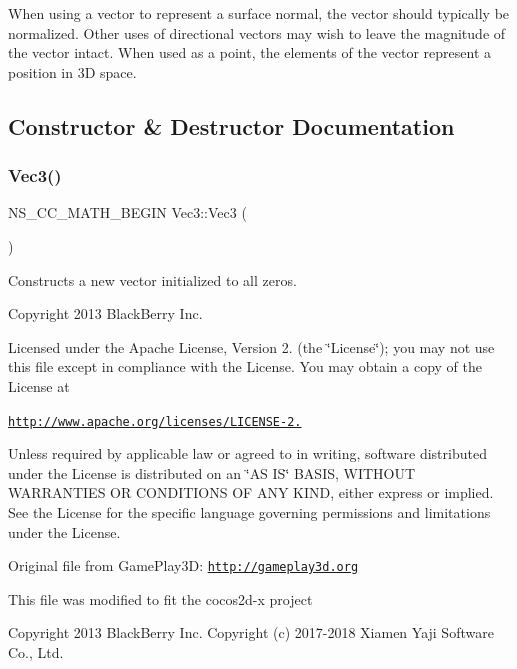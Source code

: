 When using a vector to represent a surface normal, the vector should typically be normalized. Other uses of directional vectors may wish to leave the magnitude of the vector intact. When used as a point, the elements of the vector represent a position in 3D space. 

\subsection{Constructor \& Destructor Documentation}
\mbox{\label{classVec3_a4450bf868c5115de1f2db066cb7067f4}} 
\subsubsection{\texorpdfstring{Vec3()}{Vec3()}\hspace{0.1cm}{\footnotesize\ttfamily [1/9]}}
{\footnotesize\ttfamily N\+S\+\_\+\+C\+C\+\_\+\+M\+A\+T\+H\+\_\+\+B\+E\+G\+IN Vec3\+::\+Vec3 (\begin{DoxyParamCaption}{ }\end{DoxyParamCaption})}

Constructs a new vector initialized to all zeros.

Copyright 2013 Black\+Berry Inc.

Licensed under the Apache License, Version 2. (the \char`\"{}\+License\char`\"{}); you may not use this file except in compliance with the License. You may obtain a copy of the License at

\href{http://www.apache.org/licenses/LICENSE-2.0}{\tt http\+://www.\+apache.\+org/licenses/\+L\+I\+C\+E\+N\+S\+E-\/2.}

Unless required by applicable law or agreed to in writing, software distributed under the License is distributed on an \char`\"{}\+A\+S I\+S\char`\"{} B\+A\+S\+IS, W\+I\+T\+H\+O\+UT W\+A\+R\+R\+A\+N\+T\+I\+ES OR C\+O\+N\+D\+I\+T\+I\+O\+NS OF A\+NY K\+I\+ND, either express or implied. See the License for the specific language governing permissions and limitations under the License.

Original file from Game\+Play3D\+: \href{http://gameplay3d.org}{\tt http\+://gameplay3d.\+org}

This file was modified to fit the cocos2d-\/x project

Copyright 2013 Black\+Berry Inc. Copyright (c) 2017-\/2018 Xiamen Yaji Software Co., Ltd.

